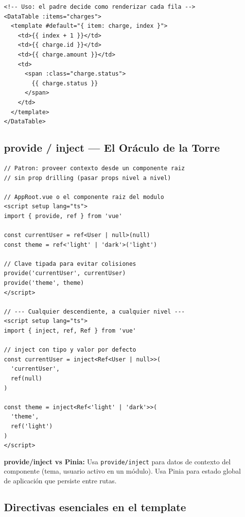 \documentclass[11pt,a4paper]{article}
\begin{document}
\begin{pergamino}
\begin{lstlisting}[style=vue]
<!-- Uso: el padre decide como renderizar cada fila -->
<DataTable :items="charges">
  <template #default="{ item: charge, index }">
    <td>{{ index + 1 }}</td>
    <td>{{ charge.id }}</td>
    <td>{{ charge.amount }}</td>
    <td>
      <span :class="charge.status">
        {{ charge.status }}
      </span>
    </td>
  </template>
</DataTable>
\end{lstlisting}
\end{pergamino}

\subsection{provide / inject — El Oráculo de la Torre}

\begin{pergamino}
\begin{lstlisting}[style=vue]
// Patron: proveer contexto desde un componente raiz
// sin prop drilling (pasar props nivel a nivel)

// AppRoot.vue o el componente raiz del modulo
<script setup lang="ts">
import { provide, ref } from 'vue'

const currentUser = ref<User | null>(null)
const theme = ref<'light' | 'dark'>('light')

// Clave tipada para evitar colisiones
provide('currentUser', currentUser)
provide('theme', theme)
</script>

// --- Cualquier descendiente, a cualquier nivel ---
<script setup lang="ts">
import { inject, ref, Ref } from 'vue'

// inject con tipo y valor por defecto
const currentUser = inject<Ref<User | null>>(
  'currentUser',
  ref(null)
)

const theme = inject<Ref<'light' | 'dark'>>(
  'theme',
  ref('light')
)
</script>
\end{lstlisting}
\end{pergamino}

\begin{cofre}
\textbf{provide/inject vs Pinia:} Usa \texttt{provide/inject} para
datos de contexto del componente (tema, usuario activo en un módulo).
Usa Pinia para estado global de aplicación que persiste entre rutas.
\end{cofre}

\subsection{Directivas esenciales en el template}
\end{document}
